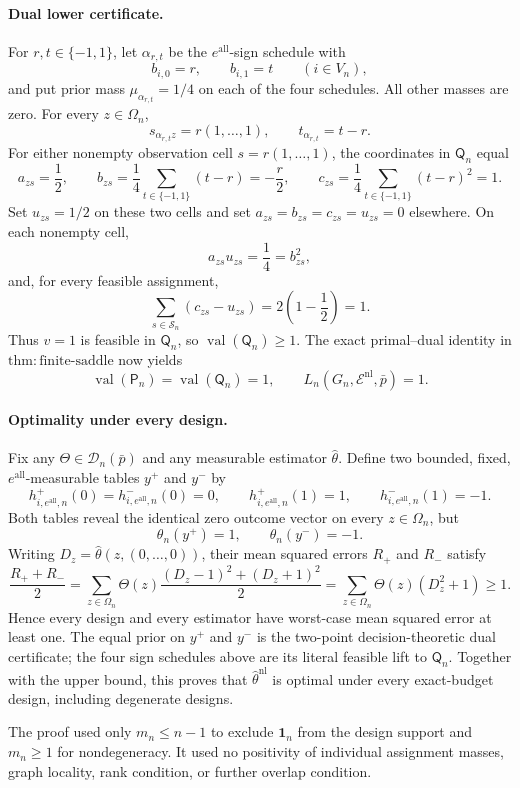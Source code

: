 \paragraph{Dual lower certificate.}
For \(r,t\in\{-1,1\}\), let \(\alpha_{r,t}\) be the \(e^{\mathrm{all}}\)-sign schedule with
\[
 b_{i,0}=r,\qquad b_{i,1}=t\qquad(i\in V_n),
\]
and put prior mass \(\mu_{\alpha_{r,t}}=1/4\) on each of the four schedules.  All other masses are zero.  For every \(z\in\Omega_n\),
\[
 s_{\alpha_{r,t}z}=r(1,\ldots,1),\qquad
 t_{\alpha_{r,t}}=t-r.
\]
For either nonempty observation cell \(s=r(1,\ldots,1)\), the coordinates in \(\mathsf Q_n\) equal
\[
 a_{zs}=\frac12,\qquad
 b_{zs}=\frac14\sum_{t\in\{-1,1\}}(t-r)=-\frac r2,
 \qquad
 c_{zs}=\frac14\sum_{t\in\{-1,1\}}(t-r)^2=1.
\]
Set \(u_{zs}=1/2\) on these two cells and set \(a_{zs}=b_{zs}=c_{zs}=u_{zs}=0\) elsewhere.  On each nonempty cell,
\[
 a_{zs}u_{zs}=\frac14=b_{zs}^2,
\]
and, for every feasible assignment,
\[
 \sum_{s\in\mathcal S_n}(c_{zs}-u_{zs})
 =2\left(1-\frac12\right)=1.
\]
Thus \(v=1\) is feasible in \(\mathsf Q_n\), so \(\operatorname{val}(\mathsf Q_n)\ge1\).  The exact primal--dual identity in \(\mathrm{thm{:}finite\text{-}saddle}\) now yields
\[
 \operatorname{val}(\mathsf P_n)=\operatorname{val}(\mathsf Q_n)=1,
 \qquad
 L_n(G_n,\mathcal E^{\mathrm{nl}},\bar p)=1.
\]

\paragraph{Optimality under every design.}
Fix any \(\Theta\in\mathcal D_n(\bar p)\) and any measurable estimator \(\widehat\theta\).  Define two bounded, fixed, \(e^{\mathrm{all}}\)-measurable tables \(y^+\) and \(y^-\) by
\[
 h^+_{i,e^{\mathrm{all}},n}(0)=h^-_{i,e^{\mathrm{all}},n}(0)=0,
 \qquad
 h^+_{i,e^{\mathrm{all}},n}(1)=1,
 \qquad
 h^-_{i,e^{\mathrm{all}},n}(1)=-1.
\]
Both tables reveal the identical zero outcome vector on every \(z\in\Omega_n\), but
\[
 \theta_n(y^+)=1,
 \qquad
 \theta_n(y^-)=-1.
\]
Writing \(D_z=\widehat\theta(z,(0,\ldots,0))\), their mean squared errors \(R_+\) and \(R_-\) satisfy
\[
 \frac{R_++R_-}{2}
 =\sum_{z\in\Omega_n}\Theta(z)
   \frac{(D_z-1)^2+(D_z+1)^2}{2}
 =\sum_{z\in\Omega_n}\Theta(z)(D_z^2+1)
 \ge1.
\]
Hence every design and every estimator have worst-case mean squared error at least one.  The equal prior on \(y^+\) and \(y^-\) is the two-point decision-theoretic dual certificate; the four sign schedules above are its literal feasible lift to \(\mathsf Q_n\).  Together with the upper bound, this proves that \(\widehat\theta^{\mathrm{nl}}\) is optimal under every exact-budget design, including degenerate designs.

The proof used only \(m_n\le n-1\) to exclude \(\mathbf 1_n\) from the design support and \(m_n\ge1\) for nondegeneracy.  It used no positivity of individual assignment masses, graph locality, rank condition, or further overlap condition.